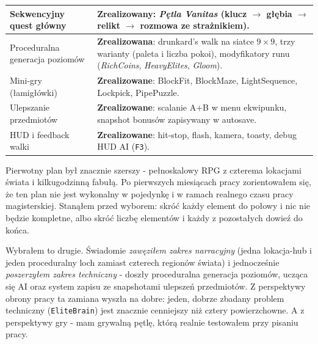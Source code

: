 \begin{longtable}{|p{}|p{}|}
\hline
Sekwencyjny quest główny & \textbf{Zrealizowany}: \textit{Pętla Vanitas} (klucz $\rightarrow$ głębia $\rightarrow$ relikt $\rightarrow$ rozmowa ze strażnikiem). \\
\hline
Proceduralna generacja poziomów & \textbf{Zrealizowana}: drunkard's walk na siatce $9 \times 9$, trzy warianty (paleta i liczba pokoi), modyfikatory runu (\textit{RichCoins}, \textit{HeavyElites}, \textit{Gloom}). \\
\hline
Mini-gry (łamigłówki) & \textbf{Zrealizowane}: BlockFit, BlockMaze, LightSequence, Lockpick, PipePuzzle. \\
\hline
Ulepszanie przedmiotów & \textbf{Zrealizowane}: scalanie A+B w menu ekwipunku, snapshot bonusów zapisywany w autosave. \\
\hline
HUD i feedback walki & \textbf{Zrealizowane}: hit-stop, flash, kamera, toasty, debug HUD AI (\texttt{F3}). \\
\hline
\end{longtable}

Pierwotny plan był znacznie szerszy - pełnoskalowy RPG z czterema lokacjami świata i kilkugodzinną fabułą. Po pierwszych miesiącach pracy zorientowałem się, że ten plan nie jest wykonalny w pojedynkę i w ramach realnego czasu pracy magisterskiej. Stanąłem przed wyborem: skróć każdy element do połowy i nic nie będzie kompletne, albo skróć liczbę elementów i każdy z pozostałych dowieź do końca.

Wybrałem to drugie. Świadomie \emph{zawęziłem zakres narracyjny} (jedna lokacja-hub i jeden proceduralny loch zamiast czterech regionów świata) i jednocześnie \emph{poszerzyłem zakres techniczny} - doszły proceduralna generacja poziomów, ucząca się AI oraz system zapisu ze snapshotami ulepszeń przedmiotów. Z perspektywy obrony pracy ta zamiana wyszła na dobre: jeden, dobrze zbadany problem techniczny (\texttt{EliteBrain}) jest znacznie cenniejszy niż cztery powierzchowne. A z perspektywy gry - mam grywalną pętlę, którą realnie testowałem przy pisaniu pracy.
